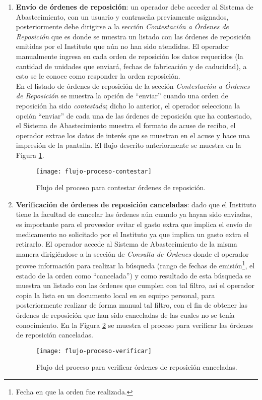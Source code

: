 \begin{enumerate}
\item \textbf{Envío de órdenes de reposición}: un operador debe acceder al Sistema de Abastecimiento, con un usuario y contraseña previamente asignados, posteriormente debe dirigirse a la sección \textit{Contestación a Órdenes de Reposición} que es donde se muestra un listado con las órdenes de reposición emitidas por el Instituto que aún no han sido atendidas. El operador manualmente ingresa en cada orden de reposición los datos requeridos (la cantidad de unidades que enviará, fechas de fabricación y de caducidad), a esto se le conoce como responder la orden reposición.\\
En el listado de órdenes de reposición de la sección \textit{Contestación a Órdenes de Reposición} se muestra la opción de ``enviar'' cuando una orden de reposición ha sido \textit{contestada}; dicho lo anterior, el operador selecciona la opción ``enviar'' de cada una de las órdenes de reposición que ha contestado, el Sistema de Abastecimiento muestra el formato de acuse de recibo, el operador extrae los datos de interés que se muestran en el acuse y hace una impresión de la pantalla. El flujo descrito anteriormente se muestra en la Figura \ref{fig:flow-proc-contestar}.

\begin{figure}[H]
\centering
\texttt{[image: flujo-proceso-contestar]} 
\caption{Flujo del proceso para contestar órdenes de reposición.}
\label{fig:flow-proc-contestar}
\end{figure}

\item \textbf{Verificación de órdenes de reposición canceladas}: dado que el Instituto tiene la facultad de cancelar las órdenes aún cuando ya hayan sido enviadas, es importante para el proveedor evitar el gasto extra que implica el envío de medicamento no solicitado por el Instituto ya que implica un gasto extra el retirarlo. El operador accede al Sistema de Abastecimiento de la misma manera dirigiéndose a la sección de \textit{Consulta de Órdenes} donde el operador provee información para realizar la búsqueda (rango de fechas de emisión\footnote{Fecha en que la orden fue realizada.}, el estado de la orden como ``cancelada'') y como resultado de esta búsqueda se muestra un listado con las órdenes que cumplen con tal filtro, así el operador copia la lista en un documento local en su equipo personal, para posteriormente realizar de forma manual tal filtro, con el fin de obtener las órdenes de reposición que han sido canceladas de las cuales no se tenía conocimiento. En la Figura \ref{fig:flow-proc-verificar} se muestra el proceso para verificar las órdenes de reposición canceladas.
\begin{figure}[H]
\centering
\texttt{[image: flujo-proceso-verificar]} 
\caption{Flujo del proceso para verificar órdenes de reposición canceladas.}
\label{fig:flow-proc-verificar}
\end{figure}
\end{enumerate}

